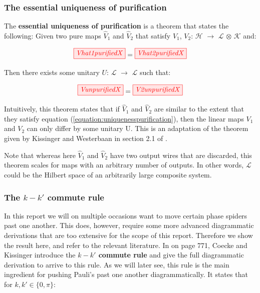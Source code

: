 \documentclass[]{article}
\begin{document}
\subsubsection{The essential uniqueness of purification}
\label{section:essentialuniqueness}

The \textbf{essential uniqueness of purification} is a theorem that states the following: Given two pure maps $\hat{V}_1$ and $\hat{V}_2$ that satisfy $V_1$, $V_2$: $\mathcal{H}$ $\rightarrow$ $\mathcal{L}$ $\otimes$ $\mathcal{K}$ and:

\begin{equation}
	\label{equation:uniquenesspurification}
	\tikzfig{Vhat1purifiedX} = \tikzfig{Vhat2purifiedX}
\end{equation}

Then there exists some unitary $U$: $\mathcal{L}$ $\rightarrow$ $\mathcal{L}$ such that:

\begin{equation}
	\tikzfig{VunpurifiedX} = \tikzfig{V2unpurifiedX}
\end{equation}

Intuitively, this theorem states that if $\hat{V}_1$ and $\hat{V}_2$ are similar to the extent that they satisfy equation (\ref{equation:uniquenesspurification}), then the linear maps $V_1$ and $V_2$ can only differ by some unitary U. This is an adaptation of the theorem given by Kissinger and Westerbaan in section 2.1 of \cite{Kissinger2017}.

Note that whereas here $\hat{V}_1$ and $\hat{V}_2$ have two output wires that are discarded, this theorem scales for maps with an arbitrary number of outputs. In other words, $\mathcal{L}$ could be the Hilbert space of an arbitrarily large composite system.

\subsubsection{The $k-k'$ commute rule}
\label{section:kkcommute}
In this report we will on multiple occasions want to move certain phase spiders past one another. This does, however, require some more advanced diagrammatic derivations that are too extensive for the scope of this report. Therefore we show the result here, and refer to the relevant literature. In \cite{Coecke2017} on page 771, Coecke and Kissinger introduce the \textbf{$k-k'$ commute rule} and give the full diagrammatic derivation to arrive to this rule. As we will later see, this rule is the main ingredient for pushing Pauli's past one another diagrammatically. It states that for $k, k' \in \{0, \pi\}$: 
\end{document}

